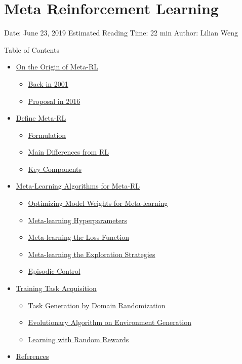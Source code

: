 \section{Meta Reinforcement Learning}\label{meta-reinforcement-learning}

Date: June 23, 2019 \textbar{} Estimated Reading Time: 22 min \textbar{} Author: Lilian Weng

{Table of Contents}

\begin{itemize}
\tightlist
\item
  \hyperref[on-the-origin-of-meta-rl]{On the Origin of Meta-RL}

  \begin{itemize}
  \tightlist
  \item
    \hyperref[back-in-2001]{Back in 2001}
  \item
    \hyperref[proposal-in-2016]{Proposal in 2016}
  \end{itemize}
\item
  \hyperref[define-meta-rl]{Define Meta-RL}

  \begin{itemize}
  \tightlist
  \item
    \hyperref[formulation]{Formulation}
  \item
    \hyperref[main-differences-from-rl]{Main Differences from RL}
  \item
    \hyperref[key-components]{Key Components}
  \end{itemize}
\item
  \hyperref[meta-learning-algorithms-for-meta-rl]{Meta-Learning Algorithms for Meta-RL}

  \begin{itemize}
  \tightlist
  \item
    \hyperref[optimizing-model-weights-for-meta-learning]{Optimizing Model Weights for Meta-learning}
  \item
    \hyperref[meta-learning-hyperparameters]{Meta-learning Hyperparameters}
  \item
    \hyperref[meta-learning-the-loss-function]{Meta-learning the Loss Function}
  \item
    \hyperref[meta-learning-the-exploration-strategies]{Meta-learning the Exploration Strategies}
  \item
    \hyperref[episodic-control]{Episodic Control}
  \end{itemize}
\item
  \hyperref[training-task-acquisition]{Training Task Acquisition}

  \begin{itemize}
  \tightlist
  \item
    \hyperref[task-generation-by-domain-randomization]{Task Generation by Domain Randomization}
  \item
    \hyperref[evolutionary-algorithm-on-environment-generation]{Evolutionary Algorithm on Environment Generation}
  \item
    \hyperref[learning-with-random-rewards]{Learning with Random Rewards}
  \end{itemize}
\item
  \hyperref[references]{References}
\end{itemize}

